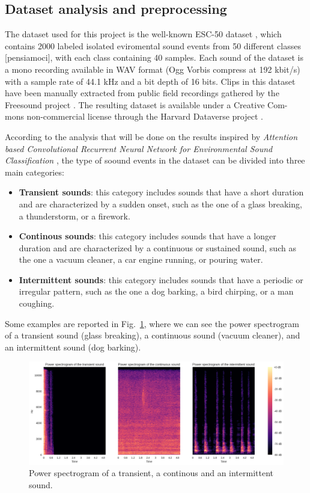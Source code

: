 \documentclass{article}
\begin{document}
\begin{sloppy}
\subsection{Dataset analysis and preprocessing}
\label{sec:format}

The dataset used for this project is the well-known ESC-50 dataset \cite{piczak2015dataset}, which contains
2000 labeled isolated eviromental sound events from 50 different classes [pensiamoci], with each class containing 40 samples.
Each sound of the dataset is a mono recording available in WAV format (Ogg Vorbis
compress at 192 kbit/s) with a sample rate of 44.1 kHz and a bit depth of 16 bits.
Clips in this dataset have been manually extracted from public field recordings gathered
by the Freesound project \cite{fonseca2020fsd50k}. The resulting dataset is available under a Creative Com-
mons non-commercial license through the Harvard Dataverse project \cite{piczak2015dataset}.

According to the analysis that will be done on the results inspired by \textit{Attention based Convolutional Recurrent Neural Network for Environmental Sound Classification} \cite{zhang2019attentionbasedconvolutionalrecurrent}, the type of soound events in the dataset can be divided into three main categories:
\begin{itemize}
    \item \textbf{Transient sounds}: this category includes sounds that have a short duration and are characterized by a sudden onset, such as the one of a glass breaking, a thunderstorm, or a firework.
    \item \textbf{Continous sounds}: this category includes sounds that have a longer duration and are characterized by a continuous or sustained sound, such as the one a vacuum cleaner, a car engine running, or pouring water.
    \item \textbf{Intermittent sounds}: this category includes sounds that have a periodic or irregular pattern, such as the one a dog barking, a bird chirping, or a man coughing.
\end{itemize}
Some examples are reported in Fig.~\ref{fig:power_spectrograms_3_sounds}, where we can see the power spectrogram of a transient sound (glass breaking), a continuous sound (vacuum cleaner), and an intermittent sound (dog barking).

\begin{figure}[ht]
  \centering
  \centerline{\includegraphics[width=\columnwidth]{Three_types_of_sound.png}}
  \caption{Power spectrogram of a transient, a continous and an intermittent sound.}
  \label{fig:power_spectrograms_3_sounds}
\end{figure}


\end{sloppy}
\end{document}
